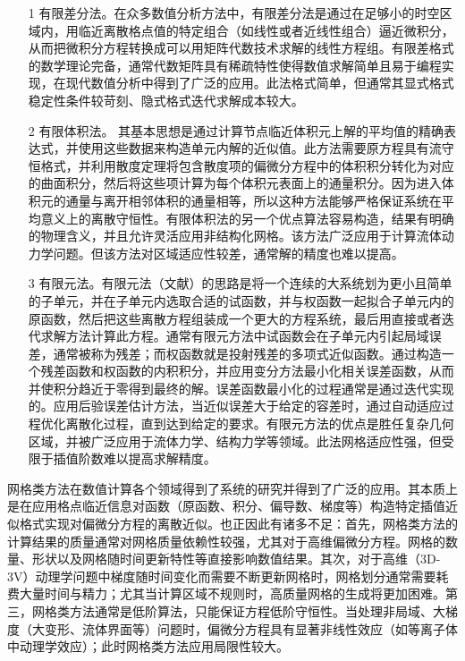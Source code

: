 \begin{itemize}
\item[1]
有限差分法。在众多数值分析方法中，有限差分法是通过在足够小的时空区域内，用临近离散格点值的特定组合（如线性或者近线性组合）逼近微积分，从而把微积分方程转换成可以用矩阵代数技术求解的线性方程组。有限差格式的数学理论完备，通常代数矩阵具有稀疏特性使得数值求解简单且易于编程实现，在现代数值分析中得到了广泛的应用。此法格式简单，但通常其显式格式稳定性条件较苛刻、隐式格式迭代求解成本较大。
\item[2]
有限体积法。 其基本思想是通过计算节点临近体积元上解的平均值的精确表达式，并使用这些数据来构造单元内解的近似值。此方法需要原方程具有流守恒格式，并利用散度定理将包含散度项的偏微分方程中的体积积分转化为对应的曲面积分，然后将这些项计算为每个体积元表面上的通量积分。因为进入体积元的通量与离开相邻体积的通量相等，所以这种方法能够严格保证系统在平均意义上的离散守恒性。有限体积法的另一个优点算法容易构造，结果有明确的物理含义，并且允许灵活应用非结构化网格。该方法广泛应用于计算流体动力学问题。但该方法对区域适应性较差，通常解的精度也难以提高。
\item[3]
有限元法。有限元法（文献）的思路是将一个连续的大系统划为更小且简单的子单元，并在子单元内选取合适的试函数，并与权函数一起拟合子单元内的原函数，然后把这些离散方程组装成一个更大的方程系统，最后用直接或者迭代求解方法计算此方程。通常有限元方法中试函数会在子单元内引起局域误差，通常被称为残差；而权函数就是投射残差的多项式近似函数。通过构造一个残差函数和权函数的内积积分，并应用变分方法最小化相关误差函数，从而并使积分趋近于零得到最终的解。误差函数最小化的过程通常是通过迭代实现的。应用后验误差估计方法，当近似误差大于给定的容差时，通过自动适应过程优化离散化过程，直到达到给定的要求。有限元方法的优点是胜任复杂几何区域，并被广泛应用于流体力学、结构力学等领域。此法网格适应性强，但受限于插值阶数难以提高求解精度。
\end{itemize}

网格类方法在数值计算各个领域得到了系统的研究并得到了广泛的应用。其本质上是在应用格点临近信息对函数（原函数、积分、偏导数、梯度等）构造特定插值近似格式实现对偏微分方程的离散近似。也正因此有诸多不足：首先，网格类方法的计算结果的质量通常对网格质量依赖性较强，尤其对于高维偏微分方程。网格的数量、形状以及网格随时间更新特性等直接影响数值结果。其次，对于高维（3D-3V）动理学问题中梯度随时间变化而需要不断更新网格时，网格划分通常需要耗费大量时间与精力；尤其当计算区域不规则时，高质量网格的生成将更加困难。第三，网格类方法通常是低阶算法，只能保证方程低阶守恒性。当处理非局域、大梯度（大变形、流体界面等）问题时，偏微分方程具有显著非线性效应（如等离子体中动理学效应）；此时网格类方法应用局限性较大。


